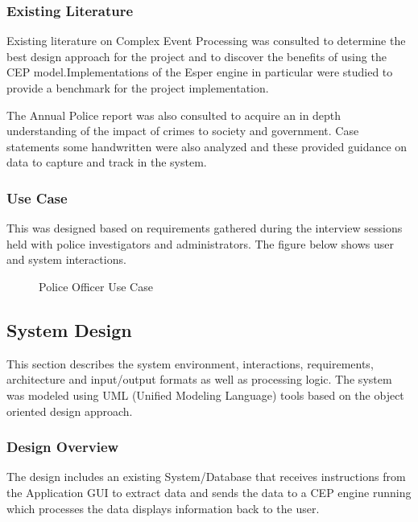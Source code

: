 \subsubsection{Existing Literature}

\noindent Existing literature on Complex Event Processing was consulted to determine the best design approach for the project and to discover the benefits of using the CEP model.Implementations of the Esper engine in particular were studied to provide a benchmark for the project implementation.

\noindent The Annual Police report was also consulted to acquire an in depth understanding of the impact of crimes to society and government. Case statements some handwritten were also analyzed and these provided guidance on data to capture and track in the system.


\subsubsection{Use Case}

\noindent This was designed based on requirements gathered during the interview sessions held with police investigators and administrators. The figure below shows user and system interactions.



\begin{center}
\begin{figure}[h]
\caption{Police Officer Use Case}

\end{figure}
\end{center}


\subsection{System Design}

\noindent This section describes the system environment, interactions, requirements, architecture and input/output formats as well as processing logic. The system was modeled using UML (Unified Modeling Language) tools based on the object oriented design approach.

\subsubsection{Design Overview}

\noindent The design includes an existing System/Database that receives instructions from the Application GUI to extract data  and sends the data to  a CEP engine running which processes the data displays information back  to the user.

